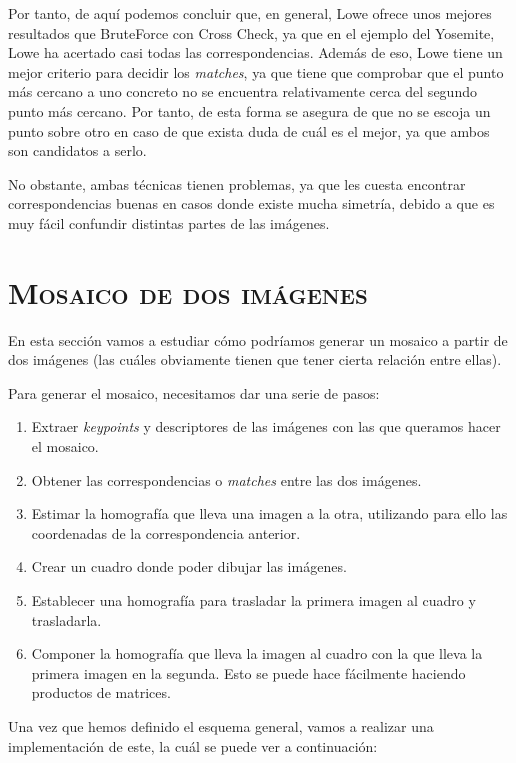 \documentclass[11pt,a4paper]{article}
\begin{document}
Por tanto, de aquí podemos concluir que, en general, Lowe ofrece unos mejores resultados que
BruteForce con Cross Check, ya que en el ejemplo del Yosemite, Lowe ha acertado casi todas
las correspondencias. Además de eso, Lowe tiene un mejor criterio para decidir los \textit{matches},
ya que tiene que comprobar que el punto más cercano a uno concreto no se encuentra relativamente
cerca del segundo punto más cercano. Por tanto, de esta forma se asegura de que no se escoja
un punto sobre otro en caso de que exista duda de cuál es el mejor, ya que ambos son candidatos
a serlo.

No obstante, ambas técnicas tienen problemas, ya que les cuesta
encontrar correspondencias buenas en casos donde existe mucha simetría, debido
a que es muy fácil confundir distintas partes de las imágenes.

\section{\textsc{Mosaico de dos imágenes}}

En esta sección vamos a estudiar cómo podríamos generar un mosaico a partir de dos
imágenes (las cuáles obviamente tienen que tener cierta relación entre ellas).

Para generar el mosaico, necesitamos dar una serie de pasos:

\begin{enumerate}
	\item Extraer \textit{keypoints} y descriptores de las imágenes con las que queramos
	hacer el mosaico.
	\item Obtener las correspondencias o \textit{matches} entre las dos imágenes.
	\item Estimar la homografía que lleva una imagen a la otra, utilizando para ello las coordenadas
	de la correspondencia anterior.
	\item Crear un cuadro donde poder dibujar las imágenes.
	\item Establecer una homografía para trasladar la primera imagen al cuadro y trasladarla.
	\item Componer la homografía que lleva la imagen al cuadro con la que lleva la primera imagen
	en la segunda. Esto se puede hace fácilmente haciendo productos de matrices.
\end{enumerate}

Una vez que hemos definido el esquema general, vamos a realizar una implementación de
este, la cuál se puede ver a continuación:
\end{document}
